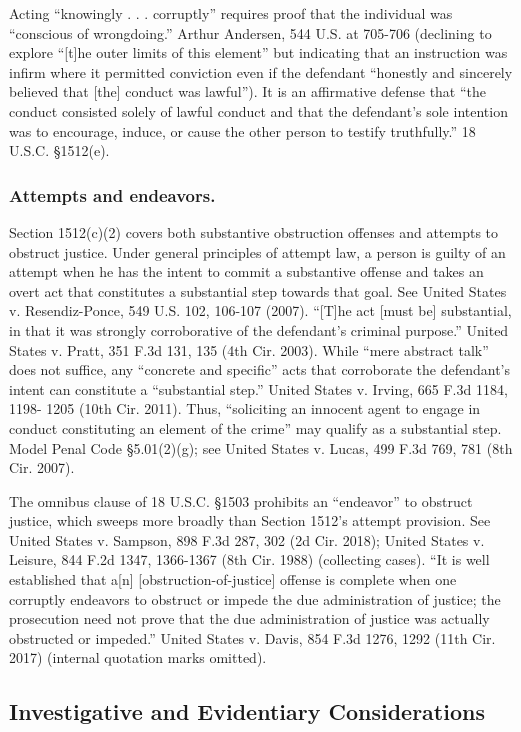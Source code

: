 Acting “knowingly . . . corruptly” requires proof that the individual was “conscious of wrongdoing.” 
Arthur Andersen, 544 U.S. at 705-706 (declining to explore “[t]he outer limits of this element” but indicating that an instruction was infirm where it permitted conviction even if the defendant “honestly and sincerely believed that [the] conduct was lawful”). 
It is an affirmative defense that “the conduct consisted solely of lawful conduct and that the defendant’s sole intention was to encourage, induce, or cause the other person to testify truthfully.” 
18 U.S.C. \S 1512(e). 

\subsubsection*{Attempts and endeavors.}
Section 1512(c)(2) covers both substantive obstruction offenses and attempts to obstruct justice. Under general principles of attempt law, a person is guilty of an attempt when he has the intent to commit a substantive offense and takes an overt act that constitutes a substantial step towards that goal. 
See United States v. Resendiz-Ponce, 549 U.S. 102, 106-107 (2007). 
“[T]he act [must be] substantial, in that it was strongly corroborative of the defendant’s criminal purpose.” 
United States v. Pratt, 351 F.3d 131, 135 (4th Cir. 2003). 
While “mere abstract talk” does not suffice, any “concrete and specific” acts that corroborate the defendant’s intent can constitute a “substantial step.” 
United States v. Irving, 665 F.3d 1184, 1198- 1205 (10th Cir. 2011). 
Thus, “soliciting an innocent agent to engage in conduct constituting an element of the crime” may qualify as a substantial step. 
Model Penal Code \S 5.01(2)(g); 
see United States v. Lucas, 499 F.3d 769, 781 (8th Cir. 2007). 

The omnibus clause of 18 U.S.C. \S 1503 prohibits an “endeavor” to obstruct justice, which sweeps more broadly than Section 1512’s attempt provision. 
See United States v. Sampson, 898 F.3d 287, 302 (2d Cir. 2018); 
United States v. Leisure, 844 F.2d 1347, 1366-1367 (8th Cir. 1988) (collecting cases). 
“It is well established that a[n] [obstruction-of-justice] offense is complete when one corruptly endeavors to obstruct or impede the due administration of justice; 
the prosecution need not prove that the due administration of justice was actually obstructed or impeded.” 
United States v. Davis, 854 F.3d 1276, 1292 (11th Cir. 2017) (internal quotation marks omitted). 

\subsection{Investigative and Evidentiary Considerations}

